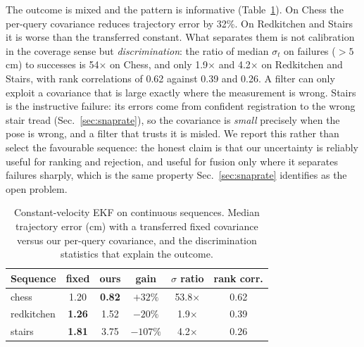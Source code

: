 \documentclass[journal]{IEEEtran}
\begin{document}
The outcome is mixed and the pattern is informative
(Table~\ref{tab:fusion}). On Chess the per-query covariance reduces
trajectory error by 32\%. On Redkitchen and Stairs it is worse than the
transferred constant. What separates them is not calibration in the coverage
sense but \emph{discrimination}: the ratio of median $\sigma_t$ on failures
($>5$\,cm) to successes is 54$\times$ on Chess, and only 1.9$\times$ and
4.2$\times$ on Redkitchen and Stairs, with rank correlations of 0.62 against
0.39 and 0.26. A filter can only exploit a covariance that is large exactly
where the measurement is wrong. Stairs is the instructive failure: its errors
come from confident registration to the wrong stair tread
(Sec.~\ref{sec:snaprate}), so the covariance is \emph{small} precisely when
the pose is wrong, and a filter that trusts it is misled. We report this
rather than select the favourable sequence: the honest claim is that our
uncertainty is reliably useful for ranking and rejection, and useful for
fusion only where it separates failures sharply, which is the same property
Sec.~\ref{sec:snaprate} identifies as the open problem.

\begin{table}[t]
\caption{Constant-velocity EKF on continuous sequences. Median trajectory
error (cm) with a transferred fixed covariance versus our per-query
covariance, and the discrimination statistics that explain the outcome.}
\label{tab:fusion}
\centering\footnotesize
\setlength{\tabcolsep}{4pt}
\begin{tabular}{@{}lccccc@{}}
\toprule
Sequence & fixed & ours & gain & $\sigma$ ratio & rank corr. \\
\midrule
chess      & 1.20 & \textbf{0.82} & $+32\%$ & 53.8$\times$ & 0.62 \\
redkitchen & \textbf{1.26} & 1.52 & $-20\%$ & 1.9$\times$ & 0.39 \\
stairs     & \textbf{1.81} & 3.75 & $-107\%$ & 4.2$\times$ & 0.26 \\
\bottomrule
\end{tabular}
\end{table}

\end{document}
